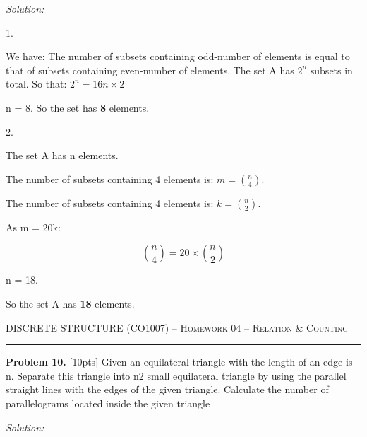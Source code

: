 \documentclass[12pt]{amsart}
\begin{document}
\textit{Solution:}

1.

We have:
The number of subsets containing odd-number of elements is equal to that of subsets containing even-number of elements.
The set A has $2^n$ subsets in total. So that:
$2^n = 16n\times2 $

n = 8.
So the set has \textbf{8} elements.

2. 

The set A has n elements.

The number of subsets containing 4 elements is: $m = \binom{n}{4}$. 

The number of subsets containing 4 elements is: $k = \binom{n}{2}$.

As m = 20k: 

\[\binom{n}{4} = 20\times\binom{n}{2}\]

n = 18.

So the set A has \textbf{18} elements.
\newpage

{\scshape } \hfill {\scshape DISCRETE STRUCTURE (CO1007) -- Homework 04 -- Relation \& Counting} \hfill {\scshape }
 
\smallskip

\hrule

\bigskip

\bigskip 

\textbf{Problem 10. }[10pts] Given an equilateral triangle with the length of an edge is n. Separate this triangle into n2 small equilateral triangle by using the parallel straight lines with the edges of the given
triangle. Calculate the number of parallelograms located inside the given triangle
\bigskip

\textit{Solution:}
\end{document}
